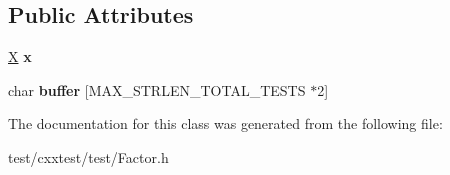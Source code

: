 \subsection*{Public Attributes}
\begin{DoxyCompactItemize}
\item 
\hypertarget{classFactor_a42be44365fe39eda10f1c9fe9f3bd7a9}{\hyperlink{classFactor_1_1X}{X} {\bfseries x}}\label{classFactor_a42be44365fe39eda10f1c9fe9f3bd7a9}

\item 
\hypertarget{classFactor_a4cb12c126492d48d1d1a374962c43617}{char {\bfseries buffer} \mbox{[}M\-A\-X\-\_\-\-S\-T\-R\-L\-E\-N\-\_\-\-T\-O\-T\-A\-L\-\_\-\-T\-E\-S\-T\-S $\ast$2\mbox{]}}\label{classFactor_a4cb12c126492d48d1d1a374962c43617}

\end{DoxyCompactItemize}


The documentation for this class was generated from the following file\-:\begin{DoxyCompactItemize}
\item 
test/cxxtest/test/Factor.\-h\end{DoxyCompactItemize}
